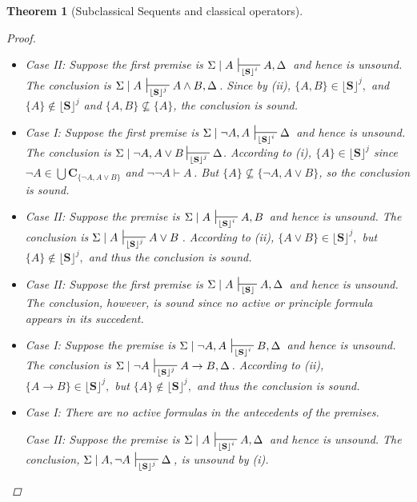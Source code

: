 \documentclass{article}                     %
\theoremstyle{theorem}
\newtheorem{theorem}{Theorem}
\theoremstyle{corollary}
\theoremstyle{lemma}
\theoremstyle{definition}
\theoremstyle{remark}
\theoremstyle{definition}
\theoremstyle{notation}
\theoremstyle{definition}
\theoremstyle{proposition}
\theoremstyle{definition}
\begin{document}
\begin{theorem}[Subclassical Sequents and classical operators]
\begin{proof}
\begin{itemize}[itemsep=3mm]
  \item[$\vdash\wedge $]
Case II: Suppose the first premise is $\Sigma\mid A \,\sststile{\lfloor\mathbf{S}\rfloor^{i}}{} A, \Delta\,$ and hence is unsound. The conclusion is $\Sigma\mid A \,\sststile{\lfloor\mathbf{S}\rfloor^{j}}{} A \wedge B, \Delta\,$. Since by (ii), $\{A,B\} \in \lfloor\mathbf{S}\rfloor^{j},$ and $ \{A\}\not\in\lfloor\mathbf{S}\rfloor^{j} $ and $ \{A,B\} \nsubseteq \{A\}  $, the conclusion is sound.

	\item[$ \vee\vdash $]
Case I: Suppose the first premise is $\Sigma\mid\neg A ,A\,\sststile{\lfloor\mathbf{S}\rfloor^{i}}{} \Delta\,$ and hence is unsound. The conclusion is $ \Sigma\mid \neg A, A \vee B\sststile{\lfloor\mathbf{S}\rfloor^{j}}{} \Delta $. According to (i), $ \{A\} \in \lfloor\mathbf{S}\rfloor^{j} $ since $\neg A \in \bigcup\mathbf{C}_{\{\neg A, A\vee B\}}$ and $ \neg\neg A \vdash A\, $. But $ \{A\} \nsubseteq \{\neg A, A \vee B\} $, so the conclusion is sound.

	\item[$\vdash\vee $]
Case II: Suppose the premise is $\Sigma\mid A\,\sststile{\lfloor\mathbf{S}\rfloor^{i}}{} A, B\,$ and hence is unsound. The conclusion is $\Sigma\mid A\,\sststile{\lfloor\mathbf{S}\rfloor^{j}}{} A \vee B\,$. According to (ii), $ \{A\vee B\} \in \lfloor\mathbf{S}\rfloor^{j},$  but $ \{A\} \not\in \lfloor\mathbf{S}\rfloor^{j},$ and thus the conclusion is sound.

 \item[$ \to\vdash $]

Case II: Suppose the first premise is $\Sigma\mid A\,\sststile{\lfloor\mathbf{S}\rfloor}{} A, \Delta\,$ and hence is unsound. The conclusion, however, is sound since no active or principle formula appears in its succedent.

	\item[$ \vdash\to $]
Case I: Suppose the premise is $\Sigma\mid\neg A ,A \,\sststile{\lfloor\mathbf{S}\rfloor^{i}}{} B, \Delta\,$ and hence is unsound. The conclusion is $ \Sigma\mid\neg A \,\sststile{\lfloor\mathbf{S}\rfloor^{j}}{} A\to B, \Delta\, $. According to (ii), $ \{A\to B\} \in \lfloor\mathbf{S}\rfloor^{j},$  but $ \{A\} \not\in \lfloor\mathbf{S}\rfloor^{j},$ and thus the conclusion is sound.

	\item[$\checkmark \neg\vdash $]
Case I: There are no active formulas in the antecedents of the premises.

Case II: Suppose the premise is $\Sigma\mid A \,\sststile{\lfloor\mathbf{S}\rfloor^{i}}{} A, \Delta\,$ and hence is unsound. The conclusion, $\Sigma\mid A, \neg A \,\sststile{\lfloor\mathbf{S}\rfloor^{j}}{} \Delta\,$, is unsound by (i). 


\end{itemize}
\end{proof}
\end{theorem}
\end{document}
